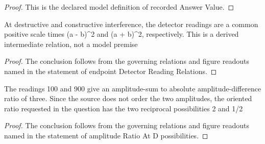\begin{proof}
  This is the declared model definition of recorded Answer Value.
\end{proof}
\begin{lemma}
  \label{lem:physics:phyx-mini-0325:phyxminiproblems-problemphyxmini0325-endpointdetectorreadingrelations}
  At destructive and constructive interference, the detector readings are a common positive scale times (a - b)\textasciicircum{}2 and (a + b)\textasciicircum{}2, respectively. This is a derived intermediate relation, not a model premise
\end{lemma}
\begin{proof}
  The conclusion follows from the governing relations and figure readouts named in the statement of endpoint Detector Reading Relations.
\end{proof}
\begin{lemma}
  \label{lem:physics:phyx-mini-0325:phyxminiproblems-problemphyxmini0325-amplituderatioatd-possibilities}
  The readings 100 and 900 give an amplitude-sum to absolute amplitude-difference ratio of three. Since the source does not order the two amplitudes, the oriented ratio requested in the question has the two reciprocal possibilities 2 and 1/2
\end{lemma}
\begin{proof}
  The conclusion follows from the governing relations and figure readouts named in the statement of amplitude Ratio At D possibilities.
\end{proof}
